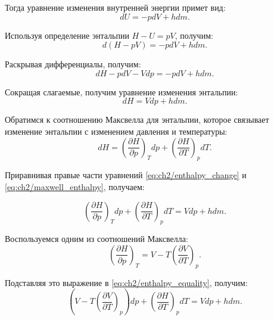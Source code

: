 Тогда уравнение изменения внутренней энергии примет вид:
\begin{equation}
\label{eq:ch2/internal_energy_change}
    dU = -pdV + hdm.
\end{equation}

Используя определение энтальпии $H - U = pV$, получим:
\begin{equation}
\label{eq:ch2/enthalpy_definition}
    d(H-pV) = -pdV + hdm.
\end{equation}

Раскрывая дифференциалы, получим:
\begin{equation}
\label{eq:ch2/enthalpy_differential}
    dH - pdV - Vdp = -pdV + hdm.
\end{equation}

Сокращая слагаемые, получим уравнение изменения энтальпии:
\begin{equation}
\label{eq:ch2/enthalpy_change}
    dH = Vdp + hdm.
\end{equation}

Обратимся к соотношению Максвелла для энтальпии, которое связывает изменение
энтальпии с изменением давления и температуры:
\begin{equation}
\label{eq:ch2/maxwell_enthalpy}
    dH = \left(
    \frac{\partial H}{\partial p}
    \right)_T dp + \left(
    \frac{\partial H}{\partial T}
    \right)_p dT.
\end{equation}

Приравнивая правые части уравнений \eqref{eq:ch2/enthalpy_change} и \eqref{eq:ch2/maxwell_enthalpy}, получаем:

\begin{equation}
\label{eq:ch2/enthalpy_equality}
    \left(
    \frac{\partial H}{\partial p}
    \right)_T dp + \left(
    \frac{\partial H}{\partial T}
    \right)_p dT = Vdp + hdm.
\end{equation}

Воспользуемся одним из соотношений Максвелла:
\begin{equation}
\label{eq:ch2/maxwell_relation}
    \left(
    \frac{\partial H}{\partial p}
    \right)_T = V - T \left(
    \frac{\partial V}{\partial T}
    \right)_p.
\end{equation}

Подставляя это выражение в \eqref{eq:ch2/enthalpy_equality}, получим:
\begin{equation}
\label{eq:ch2/enthalpy_substitution}
    \left( V - T \left(
        \frac{\partial V}{\partial T}
        \right)_p \right) dp + \left(
    \frac{\partial H}{\partial T}
    \right)_p dT = Vdp + hdm.
\end{equation}

